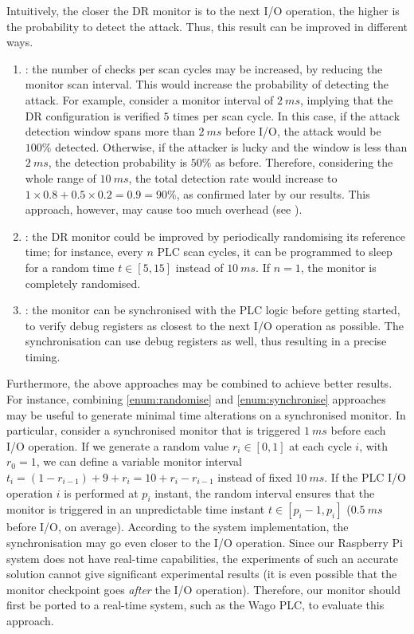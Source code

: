 Intuitively, the closer the DR monitor is to the next I/O operation, the higher is the probability to detect the attack.
Thus, this result can be improved in different ways.
\begin{enumerate}
	\item \label{enum:increase} : the number of checks per scan cycles may be increased, by reducing the monitor scan interval.
		This would increase the probability of detecting the attack.
		For example, consider a monitor interval of $\SI{2}{ms}$, implying that the DR configuration is verified $5$ times per scan cycle.
		In this case, if the attack detection window spans more than $\SI{2}{ms}$ before I/O, the attack would be $100\%$ detected.
		Otherwise, if the attacker is lucky and the window is less than $\SI{2}{ms}$, the detection probability is $50\%$ as before.
		Therefore, considering the whole range of $\SI{10}{ms}$, the total detection rate would increase to $1 \times 0.8 + 0.5 \times 0.2 = 0.9 = 90\%$,
		as confirmed later by our results. This approach, however, may cause too much overhead (see ).
	\item \label{enum:randomise} : the DR monitor could be improved by periodically randomising its reference time; for instance, every $n$ PLC scan cycles,
		it can be programmed to sleep for a random time $t \in [5,15]$ instead of $\SI{10}{ms}$. If $n=1$, the monitor is completely randomised.
	\item \label{enum:synchronise} : the monitor can be synchronised with the PLC logic before getting started,
		to verify debug registers as closest to the next I/O operation as possible. The synchronisation can use debug registers as well,
		thus resulting in a precise timing.
\end{enumerate}
Furthermore, the above approaches may be combined to achieve better results.
For instance, combining \ref{enum:randomise} and \ref{enum:synchronise} approaches may be useful to generate minimal time alterations on a synchronised monitor.
In particular, consider a synchronised monitor that is triggered $\SI{1}{ms}$ before each I/O operation.
If we generate a random value $r_i \in [0,1]$ at each cycle $i$, with $r_0 = 1$, we can define a variable monitor interval $t_i = (1 - r_{i-1}) + 9 + r_i = 10 + r_i - r_{i-1}$
instead of fixed $\SI{10}{ms}$. If the PLC I/O operation $i$ is performed at $p_i$ instant, the random interval ensures that the monitor is triggered
in an unpredictable time instant $t \in [p_i-1,p_i]$ (\ie $\SI{0.5}{ms}$ before I/O, on average).
According to the system implementation, the synchronisation may go even closer to the I/O operation.
Since our Raspberry Pi system does not have real-time capabilities, the experiments of such an accurate solution cannot give significant experimental results
(\eg it is even possible that the monitor checkpoint goes \emph{after} the I/O operation).
Therefore, our monitor should first be ported to a real-time system, such as the Wago PLC, to evaluate this approach.

